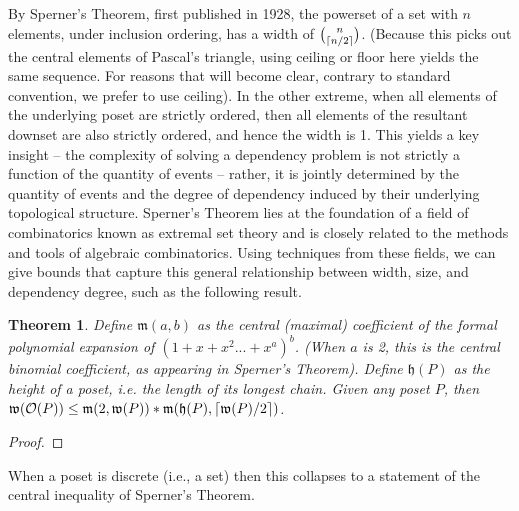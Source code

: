 \documentclass[hoptionsi,review,format=acmsmall]{acmart}
\newtheorem{theorem}{Theorem}[section]
\theoremstyle{definition}
\newcommand{\Oc}{\mathcal{O}}
\newcommand{\Mf}{\mathfrak{m}}
\newcommand{\Wf}{\mathfrak{w}}
\newcommand{\Hf}{\mathfrak{h}}
\DeclarePairedDelimiter\ceil{\lceil}{\rceil}
\begin{document}
By Sperner's Theorem, first published in 1928, the powerset of a set with \(n\) elements, under inclusion ordering, has a width of \(\binom{n}{\ceil{n/2}}\). (Because this picks out the central elements of Pascal's triangle, using ceiling or floor here yields the same sequence. For reasons that will become clear, contrary to standard convention, we prefer to use ceiling). In the other extreme, when all elements of the underlying poset are strictly ordered, then all elements of the resultant downset are also strictly ordered, and hence the width is 1. This yields a key insight -- the complexity of solving a dependency problem is not strictly a function of the quantity of events -- rather, it is jointly determined by the quantity of events and the degree of dependency induced by their underlying topological structure. Sperner's Theorem lies at the foundation of a field of combinatorics known as extremal set theory and is closely related to the methods and tools of algebraic combinatorics. Using techniques from these fields, we can give bounds that capture this general relationship between width, size, and dependency degree, such as the following result.

\begin{theorem}
Define \(\Mf(a,b)\) as the central (maximal) coefficient of the formal polynomial expansion of \((1 + x + x^2 ... + x^a)^b\). (When \(a\) is 2, this is the central binomial coefficient, as appearing in Sperner's Theorem). Define \(\Hf(P)\) as the height of a poset, i.e. the length of its longest chain. Given any poset \(P\), then \(\Wf(\Oc(P)) \le \Mf(2,\Wf(P)) * \Mf(\Hf(P),\ceil{\Wf(P)/2})\).
\end{theorem}

\begin{proof}
\end{proof}

When a poset is discrete (i.e., a set) then this collapses to a statement of the central inequality of Sperner's Theorem.



\end{document}
